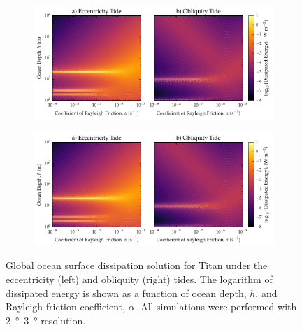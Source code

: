 \begin{figure}[!t]
    \centering
    \begin{subfigure}[t]{0.9\linewidth} %
        \includegraphics[width=\linewidth]{Figures/titan_linear}
        \label{fig:lincEccTitan}
    \end{subfigure}
    \begin{subfigure}[t]{0\linewidth} %
         \includegraphics[width=\linewidth]{Figures/titan_linear}
         \label{fig:linObliqTitan}   
    \end{subfigure}
    \vspace{-0.5cm}
\caption{Global ocean surface dissipation solution for Titan under the eccentricity (left) and obliquity (right) tides. The logarithm of dissipated energy is shown as a function of ocean depth, $h$, and Rayleigh friction coefficient, $\alpha$. All simulations were performed with \SIrange{2}{3}{\degree} resolution.}
\label{fig:linTitan}
\end{figure}

